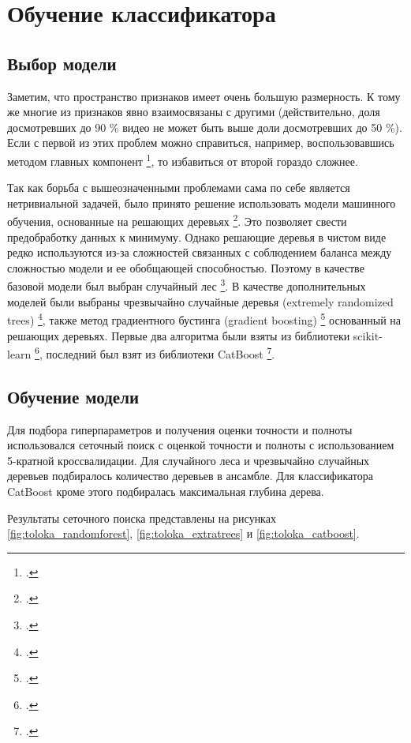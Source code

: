 \chapter{Обучение классификатора}

\section{Выбор модели}

Заметим, что пространство признаков имеет очень большую размерность. К тому же многие из признаков явно взаимосвязаны с другими (действительно, доля досмотревших до 90 \% видео не может быть выше доли досмотревших до 50 \%). Если с первой из этих проблем можно справиться, например, воспользовавшись методом главных компонент \footcite{Pearson1901}, то избавиться от второй гораздо сложнее.

Так как борьба с вышеозначенными проблемами сама по себе является нетривиальной задачей, было принято решение использовать модели машинного обучения, основанные на решающих деревьях \footcite{LeoConsultant1984}. Это позволяет свести предобработку данных к минимуму. Однако решающие деревья в чистом виде редко используются из-за сложностей связанных с соблюдением баланса между сложностью модели и ее обобщающей способностью. Поэтому в качестве базовой модели был выбран случайный лес \footcite{Ho}. В качестве дополнительных моделей были выбраны чрезвычайно случайные деревья (extremely randomized trees) \footcite{Geurts2006}, также метод градиентного бустинга (gradient boosting) \footcite{Friedman2001} основанный на решающих деревьях. Первые два алгоритма были взяты из библиотеки scikit-learn \footcite{scikit-learn}, последний был взят из библиотеки CatBoost \footcite{Prokhorenkova2017}.

\section{Обучение модели}

Для подбора гиперпараметров и получения оценки точности и полноты использовался сеточный поиск с оценкой точности и полноты с использованием 5-кратной кроссвалидации. Для случайного леса и чрезвычайно случайных деревьев подбиралось количество деревьев в ансамбле. Для классификатора CatBoost кроме этого подбиралась максимальная глубина дерева.

Результаты сеточного поиска представлены на рисунках \ref{fig:toloka_randomforest}, \ref{fig:toloka_extratrees} и \ref{fig:toloka_catboost}.

